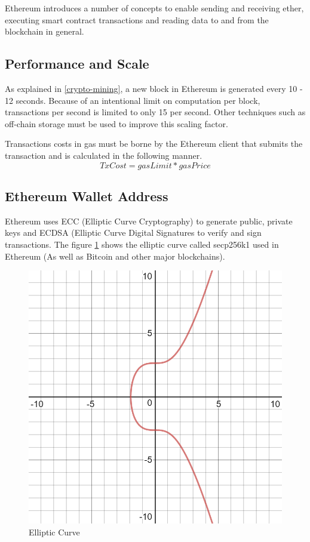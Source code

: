 \documentclass[11pt,openright]{report}
\begin{document}
Ethereum introduces a number of concepts to enable sending and receiving ether, executing smart contract transactions and reading data to and from the blockchain in general.



\subsection{Performance and Scale}
As explained in \ref{crypto-mining}, a new block in Ethereum is generated every 10 - 12 seconds. Because of an intentional limit on computation per block, transactions per second is limited to only 15 per second. Other techniques such as off-chain storage must be used to improve this scaling factor. 

Transactions costs in gas must be borne by the Ethereum client that submits the transaction and is calculated in the following manner.
\begin{equation}
    TxCost = gasLimit * gasPrice
\end{equation}

\subsection{Ethereum Wallet Address}
Ethereum uses ECC (Elliptic Curve Cryptography) to generate public, private keys and ECDSA (Elliptic Curve Digital Signatures to verify and sign transactions. The figure \ref{fig:elliptic_curve} shows the elliptic curve called secp256k1 used in Ethereum (As well as Bitcoin and other major blockchains).

\begin{figure}
	\centering
	\includegraphics[scale=0.5]{images/ecc.png}
	\caption{Elliptic Curve}
	\label{fig:elliptic_curve}
\end{figure}
\end{document}
